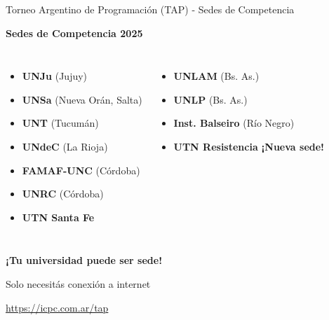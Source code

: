 \documentclass{beamer}
\begin{document}
\begin{frame}{Torneo Argentino de Programación (TAP) - Sedes de Competencia}
\begin{center}
\Large
\textbf{Sedes de Competencia 2025}

\vspace{0.3cm}

\normalsize
\begin{columns}[t]
\begin{itemize}
\item \textbf{UNJu} (Jujuy)
\item \textbf{UNSa} (Nueva Orán, Salta)
\item \textbf{UNT} (Tucumán)
\item \textbf{UNdeC} (La Rioja)
\item \textbf{FAMAF-UNC} (Córdoba)
\item \textbf{UNRC} (Córdoba)
\item \textbf{UTN Santa Fe}
\end{itemize}

\begin{itemize}
\item \textbf{UNLAM} (Bs. As.)
\item \textbf{UNLP} (Bs. As.)
\item \textbf{Inst. Balseiro} (Río Negro)
\item \textbf{UTN Resistencia} \textbf{¡Nueva sede!}
\end{itemize}

\end{columns}

\vspace{0.3cm}

\textbf{¡Tu universidad puede ser sede!}

\vspace{0.2cm}

\normalsize
Solo necesitás conexión a internet

\vspace{0.2cm}

\small
\url{https://icpc.com.ar/tap}
\end{center}
\end{frame}
\end{document}
